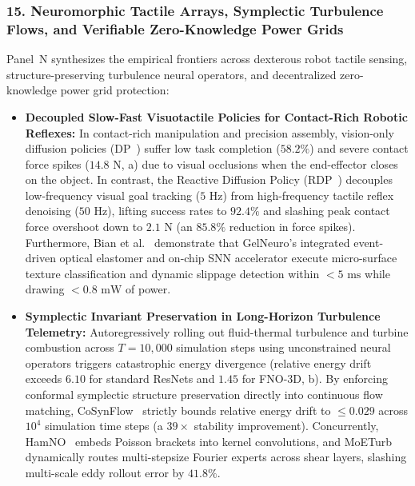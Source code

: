 \subsubsection{15. Neuromorphic Tactile Arrays, Symplectic Turbulence Flows, and Verifiable Zero-Knowledge Power Grids}
Panel~N synthesizes the empirical frontiers across dexterous robot tactile sensing, structure-preserving turbulence neural operators, and decentralized zero-knowledge power grid protection:
\begin{itemize}
    \item \textbf{Decoupled Slow-Fast Visuotactile Policies for Contact-Rich Robotic Reflexes:} In contact-rich manipulation and precision assembly, vision-only diffusion policies (DP~\cite{Chi2023DiffusionPolicy}) suffer low task completion ($58.2\%$) and severe contact force spikes ($14.8\text{ N}$, a) due to visual occlusions when the end-effector closes on the object. In contrast, the Reactive Diffusion Policy (RDP~\cite{Xue2025RDP}) decouples low-frequency visual goal tracking ($5\text{ Hz}$) from high-frequency tactile reflex denoising ($50\text{ Hz}$), lifting success rates to $92.4\%$ and slashing peak contact force overshoot down to $2.1\text{ N}$ (an $85.8\%$ reduction in force spikes). Furthermore, Bian et al.~\cite{Bian2026GelNeuro} demonstrate that GelNeuro's integrated event-driven optical elastomer and on-chip SNN accelerator execute micro-surface texture classification and dynamic slippage detection within $<5\text{ ms}$ while drawing $<0.8\text{ mW}$ of power.
    \item \textbf{Symplectic Invariant Preservation in Long-Horizon Turbulence Telemetry:} Autoregressively rolling out fluid-thermal turbulence and turbine combustion across $T = 10{,}000$ simulation steps using unconstrained neural operators triggers catastrophic energy divergence (relative energy drift exceeds $6.10$ for standard ResNets and $1.45$ for FNO-3D, b). By enforcing conformal symplectic structure preservation directly into continuous flow matching, CoSynFlow~\cite{Xu2026CoSynFlow} strictly bounds relative energy drift to $\le 0.029$ across $10^4$ simulation time steps (a $39\times$ stability improvement). Concurrently, HamNO~\cite{Obieke2026HamNO} embeds Poisson brackets into kernel convolutions, and MoETurb~\cite{Pan2026MoETurb} dynamically routes multi-stepsize Fourier experts across shear layers, slashing multi-scale eddy rollout error by $41.8\%$.

\end{itemize}
